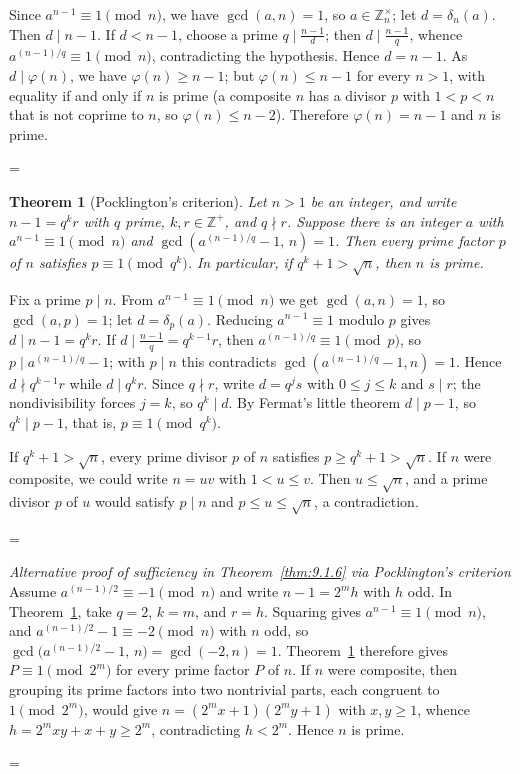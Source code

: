 \documentclass[11pt]{article}
\makeatletter
\theoremstyle{ntstyle}
\newtheorem{theorem}{Theorem}[subsection]
\let\nt@closedisplay\]
\def\nt@guardedclose{\@ifnextchar\par{\nt@closeafterpar}{\@ifnextchar\end{\postdisplaypenalty\@M\nt@closedisplay}{\nt@closedisplay}}}
\def\nt@closeafterpar\par{\@ifnextchar\par{\nt@closeafterpar}{\@ifnextchar\end{\postdisplaypenalty\@M\nt@closedisplay\par}{\nt@closedisplay\par}}}
\renewenvironment{proof}[1][\proofname]{\par
  \pushQED{\qed}\normalfont\topsep\medskipamount\edef\nt@afterproof{\@endparpenalty=\the\@endparpenalty\relax}\@beginparpenalty\@M\@endparpenalty\@M\let\]\nt@guardedclose\trivlist\item[]\textit{#1\@addpunct{.}} \ignorespaces}{\ifvmode\addpenalty\@M\fi\popQED\nt@afterproof\endtrivlist\@endpefalse}
\newenvironment{altproof}[1][\proofname]{\begin{proof}[#1]\renewcommand{\qedsymbol}{}}{\end{proof}}
\newcommand{\ZmodUnits}[1]{\mathbb{Z}_{#1}^{\times}}
\makeatother
\begin{document}
\begin{proof} Since $a^{n-1}\equiv1\pmod{n}$,
	we have $\gcd(a, n)=1$, so $a\in\ZmodUnits{n}$; let
	$d=\delta_n(a)$. Then $d\mid n-1$. If $d<n-1$, choose a
	prime $q\mid\tfrac{n-1}{d}$; then $d\mid\tfrac{n-1}{q}$, whence
	$a^{(n-1)/q}\equiv1\pmod{n}$, contradicting the hypothesis. Hence
	$d=n-1$. As $d\mid\varphi(n)$, we have $\varphi(n)\ge n-1$; but $\varphi(n)\le n-1$ for every $n>1$, with equality if and only if $n$ is prime (a composite $n$ has a divisor $p$ with $1<p<n$ that is not coprime to $n$, so $\varphi(n)\le n-2$). Therefore $\varphi(n)=n-1$ and $n$ is prime.

\end{proof}
\begin{theorem}[Pocklington's criterion]\label{thm:9.1.9} Let
	$n>1$ be an integer, and write $n-1=q^{k}r$ with $q$ prime,
	$k,r\in\mathbb{Z}^+$, and $q\nmid r$. Suppose there is an
	integer $a$ with $a^{n-1}\equiv1\pmod{n}$ and
	$\gcd\left(a^{(n-1)/q}-1,\,n\right)=1$. Then every prime factor $p$
	of $n$ satisfies $p\equiv1\pmod{q^{k}}$.
	In particular, if $q^k+1>\sqrt n$, then $n$ is prime.

\end{theorem}

\begin{proof} Fix a prime $p\mid n$. From
	$a^{n-1}\equiv1\pmod{n}$ we get $\gcd(a, n)=1$, so $\gcd(a, p)=1$; let
	$d=\delta_p(a)$. Reducing $a^{n-1}\equiv1$ modulo $p$
	gives $d\mid n-1=q^{k}r$. If $d\mid\tfrac{n-1}{q}=q^{k-1}r$, then
	$a^{(n-1)/q}\equiv1\pmod{p}$, so $p\mid a^{(n-1)/q}-1$; with $p\mid n$
	this contradicts $\gcd(a^{(n-1)/q}-1, n)=1$. Hence $d\nmid q^{k-1}r$
	while $d\mid q^{k}r$. Since $q\nmid r$, write $d=q^js$ with
	$0\le j\le k$ and $s\mid r$; the nondivisibility forces $j=k$, so
	$q^k\mid d$. By Fermat's little
	theorem $d\mid p-1$, so $q^{k}\mid p-1$, that is, $p\equiv1\pmod{q^{k}}$.

	If $q^k+1>\sqrt n$, every prime divisor $p$ of $n$ satisfies
	$p\ge q^k+1>\sqrt n$. If $n$ were composite, we could write $n=uv$
	with $1<u\le v$. Then $u\le\sqrt n$, and a prime divisor
	$p$ of $u$ would satisfy $p\mid n$ and $p\le u\le\sqrt n$,
	a contradiction.

\end{proof}
\begin{altproof}[Alternative proof of sufficiency in Theorem~\ref{thm:9.1.6} via Pocklington's criterion] Assume $a^{(n-1)/2}\equiv-1\pmod{n}$ and write $n-1=2^{m}h$
	with $h$ odd. In Theorem~\ref{thm:9.1.9}, take $q=2$, $k=m$, and
	$r=h$. Squaring
	gives $a^{n-1}\equiv1\pmod{n}$, and $a^{(n-1)/2}-1\equiv-2\pmod{n}$ with
	$n$ odd, so $\gcd\big(a^{(n-1)/2}-1,\,n\big)=\gcd(-2,n)=1$. Theorem~\ref{thm:9.1.9} therefore gives $P\equiv1\pmod{2^{m}}$ for every prime factor $P$
	of $n$. If $n$ were composite, then grouping its prime factors into two
	nontrivial parts, each congruent to $1\pmod{2^{m}}$, would give
	$n=(2^{m}x+1)(2^{m}y+1)$ with $x,y\ge1$, whence
	$h=2^{m}xy+x+y\ge2^{m}$, contradicting $h<2^{m}$. Hence $n$ is prime.

\end{altproof}
\end{document}
